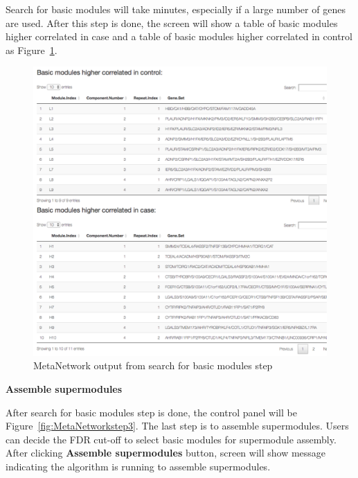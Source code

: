 \begin{steps}
Search for basic modules will take minutes, especially if a large number of genes are used. After this step is done, the screen will show a table of basic modules higher correlated in case and a table of basic modules higher correlated in control as Figure~\ref{fig:MetaNetworkBM}. 

\begin{figure}[H]
\begin{center}
\includegraphics[scale=0.8]{./figure/MetaNetwork/MetaNetworkBM}
\caption{MetaNetwork output from search for basic modules step}
\label{fig:MetaNetworkBM}
\end{center}
\end{figure}

\item \textbf{Assemble supermodules}

After search for basic modules step is done, the control panel will be Figure~\ref{fig:MetaNetworkstep3}. The last step is to assemble supermodules. Users can decide the FDR cut-off to select basic modules for supermodule assembly. After clicking \textbf{Assemble supermodules} button, screen will show message indicating the algorithm is running to assemble supermodules.


\end{steps}
